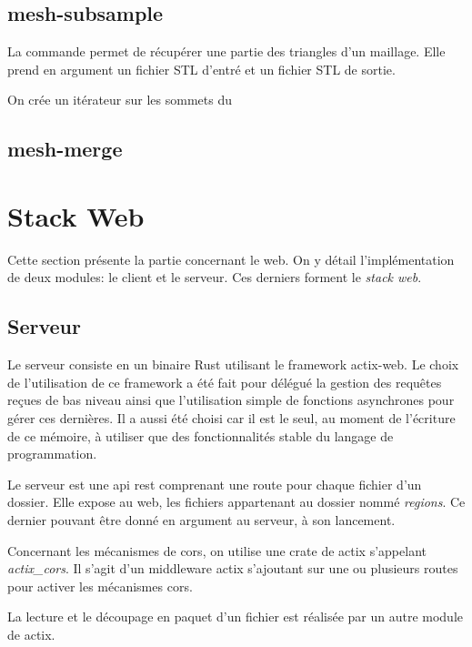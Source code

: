 \subsection{mesh-subsample}

La commande permet de récupérer une partie des triangles d'un maillage. Elle
prend en argument un fichier STL d'entré et un fichier STL de sortie.

On crée un itérateur sur les sommets du 

\subsection{mesh-merge}

\section{Stack Web}

Cette section présente la partie concernant le web. On y détail l'implémentation
de deux modules: le client et le serveur.
Ces derniers forment le \textit{stack web}.

\subsection{Serveur}

Le serveur consiste en un binaire Rust utilisant le framework actix-web.
Le choix de l'utilisation de ce framework a été fait pour délégué la gestion des
requêtes reçues de bas niveau ainsi que l'utilisation simple de fonctions
asynchrones pour gérer ces dernières.
Il a aussi été choisi car il est le seul, au moment de l'écriture de ce mémoire,
à utiliser que des fonctionnalités stable du langage de programmation.

Le serveur est une \gls{api} \gls{rest} comprenant une route pour chaque fichier
d'un dossier.
Elle expose au web, les fichiers appartenant au dossier nommé \textit{regions}.
Ce dernier pouvant être donné en argument au serveur, à son lancement.

Concernant les mécanismes de \gls{cors}, on utilise une crate de actix
s'appelant \textit{actix\_cors}.
Il s'agit d'un middleware actix s'ajoutant sur une ou plusieurs routes pour
activer les mécanismes \gls{cors}.

La lecture et le découpage en paquet d'un fichier est réalisée par un autre
module de actix.

